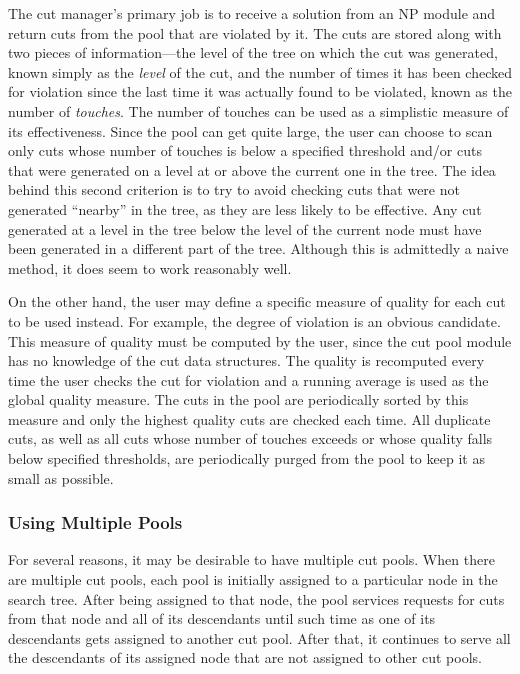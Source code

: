 The cut manager's primary job is to receive a solution from an
NP module and return cuts from the pool that are violated by it. The
cuts are stored along with two pieces of information---the level of
the tree on which the cut was generated, known simply as the {\em
level} of the cut, and the number of times it has been checked for
violation since the last time it was actually found to be violated,
known as the number of {\em touches}. The number of touches
can be used as a simplistic measure of its effectiveness. Since the pool
can get quite large, the user can choose to scan only cuts whose
number of touches is below a specified threshold and/or cuts that were
generated on a level at or above the current one in the tree. The idea
behind this second criterion is to try to avoid checking cuts that were
not generated ``nearby'' in the tree, as they are less likely to be
effective. Any cut generated at a level in the tree
below the level of the current node must have been generated in a
different part of the tree. Although this is admittedly a naive
method, it does seem to work reasonably well.

On the other hand, the user may define a specific measure of quality for
each cut to be used instead. For example, the degree of
violation is an obvious candidate. This measure of quality must be
computed by the user, since the cut pool module has no knowledge of
the cut data structures. The quality is recomputed every time
the user checks the cut for violation and a running average is used as
the global quality measure. The cuts in the pool are periodically
sorted by this measure and only the highest quality cuts
are checked each time. All duplicate cuts, as well as all cuts whose
number of touches exceeds or whose quality falls below specified
thresholds, are periodically purged from the pool to keep it as small as
possible.

\subsubsection{Using Multiple Pools}
\label{multi-cut-pools}

For several reasons, it may be desirable to have multiple cut pools.
When there are multiple cut pools, each pool is initially assigned
to a particular node in the search tree. After being assigned to that
node, the pool services requests for cuts from that node and all
of its descendants until such time as one of its descendants gets
assigned to another cut pool. After that, it continues to
serve all the descendants of its assigned node that are not assigned
to other cut pools.

